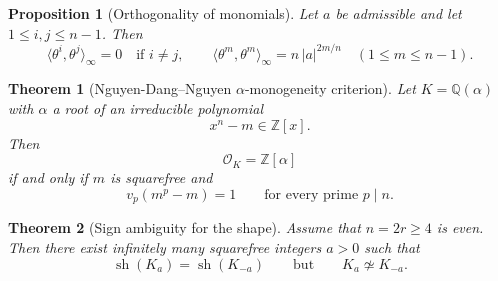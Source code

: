 \documentclass[10pt,a4paper]{amsart}
\newtheorem{proposition}{Proposition}
\newtheorem{theorem}{Theorem}
\newcommand{\Q}{\mathbb{Q}}
\newcommand{\Z}{\mathbb{Z}}
\newcommand{\cO}{\mathcal{O}}
\begin{document}
\begin{proposition}[Orthogonality of monomials]\label{prop:orthogonality}
Let $a$ be admissible and let $1\le i,j\le n-1$.
Then
\[
\langle \theta^i,\theta^j\rangle_\infty=0\quad\text{if }i\neq j,
\qquad
\langle \theta^m,\theta^m\rangle_\infty=n\,|a|^{2m/n}\quad(1\le m\le n-1).
\]
\end{proposition}

\begin{theorem}[Nguyen-Dang--Nguyen \(\alpha\)-monogeneity criterion]
\label{thm:NDH-monogenic}
Let \(K=\Q(\alpha)\) with \(\alpha\) a root of an irreducible polynomial
\[
x^n-m\in \Z[x].
\]
Then
\[
\cO_K=\Z[\alpha]
\]
if and only if \(m\) is squarefree and
\[
v_p(m^p-m)=1
\qquad\text{for every prime }p\mid n.
\]
\end{theorem}

\begin{theorem}[Sign ambiguity for the shape]\label{thm:even-Sh-ambiguity}
Assume that $n=2r \geq 4$ is even.
Then there exist infinitely many squarefree integers $a>0$ such that
\[
\operatorname{sh}(K_a)=\operatorname{sh}(K_{-a})
\qquad\text{but}\qquad
K_a\not\simeq K_{-a}.
\]
\end{theorem}
\end{document}
